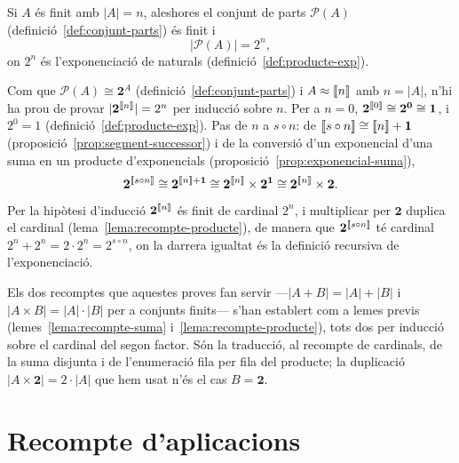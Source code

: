 \begin{teorema}\label{teo:nombre-parts}
Si \(A\) és finit amb \(|A|=n\), aleshores el conjunt de parts
\(\mathcal P(A)\) (definició~\ref{def:conjunt-parts}) és finit i
\[
|\mathcal P(A)|=2^{n},
\]
on \(2^{n}\) és l'exponenciació de naturals
(definició~\ref{def:producte-exp}).
\end{teorema}

\begin{prova}
Com que \(\mathcal P(A)\cong\mathbf2^{A}\)
(definició~\ref{def:conjunt-parts}) i \(A\approx\llbracket n\rrbracket\) amb \(n=|A|\),
n'hi ha prou de provar \(|\mathbf2^{\llbracket n\rrbracket}|=2^{n}\) per inducció sobre
\(n\). Per a \(n=0\), \(\mathbf2^{\llbracket 0\rrbracket}\cong\mathbf2^{\mathbf0}\cong
\mathbf1\), i \(2^{0}=1\) (definició~\ref{def:producte-exp}). Pas de \(n\)
a \(s\circ n\): de \(\llbracket s\circ n\rrbracket\cong\llbracket n\rrbracket+\mathbf1\)
(proposició~\ref{prop:segment-successor}) i de la conversió d'un
exponencial d'una suma en un producte d'exponencials
(proposició~\ref{prop:exponencial-suma}),
\[
\mathbf2^{\llbracket s\circ n\rrbracket}\cong\mathbf2^{\llbracket n\rrbracket+\mathbf1}\cong
\mathbf2^{\llbracket n\rrbracket}\times\mathbf2^{\mathbf1}\cong\mathbf2^{\llbracket n\rrbracket}\times\mathbf2 .
\]
Per la hipòtesi d'inducció \(\mathbf2^{\llbracket n\rrbracket}\) és finit de cardinal
\(2^{n}\), i multiplicar per \(\mathbf2\) duplica el cardinal
(lema~\ref{lema:recompte-producte}), de manera que
\(\mathbf2^{\llbracket s\circ n\rrbracket}\) té cardinal \(2^{n}+2^{n}=2\cdot2^{n}=
2^{s\circ n}\), on la darrera igualtat és la definició recursiva de
l'exponenciació.
\end{prova}

\begin{observacio}\label{obs:recompte-producte-suma}
Els dos recomptes que aquestes proves fan servir ---\(|A+B|=|A|+|B|\) i
\(|A\times B|=|A|\cdot|B|\) per a conjunts finits--- s'han establert com a
lemes previs (lemes~\ref{lema:recompte-suma} i~\ref{lema:recompte-producte}),
tots dos per inducció sobre el cardinal del segon factor. Són la traducció,
al recompte de cardinals, de la suma disjunta i de l'enumeració fila per
fila del producte; la duplicació \(|A\times\mathbf2|=2\cdot|A|\) que hem
usat n'és el cas \(B=\mathbf2\).
\end{observacio}

\section{Recompte d'aplicacions}\label{sec:recompte-aplicacions}

